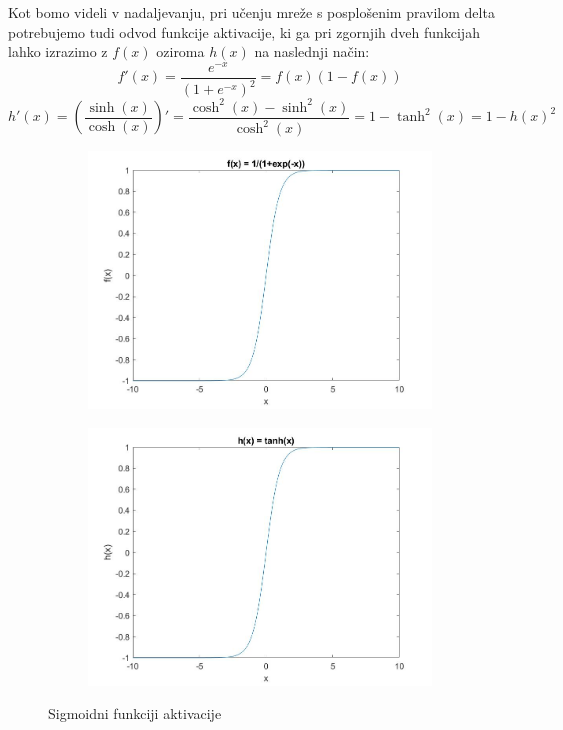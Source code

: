 \documentclass[mat1]{fmfdelo}
\begin{document}
Kot bomo videli v nadaljevanju, pri učenju mreže s posplošenim pravilom delta potrebujemo tudi odvod funkcije aktivacije, ki ga pri zgornjih dveh funkcijah lahko izrazimo z $f(x)$ oziroma $h(x)$ na naslednji način:
%
\begin{equation}
f'(x) = \frac{e^{-x}}{(1+e^{-x})^2} = f(x)(1-f(x))
\end{equation}
%
\begin{equation}
h'(x) = \left(\frac{\sinh(x)}{\cosh(x)}\right)' = \frac{\cosh^2(x)- \sinh^2(x)}{\cosh^2(x)} = 1 - \tanh^2(x) = 1 - h(x)^2 
\end{equation}
%
\begin{figure}[!th]
\centering
\begin{subfigure}{.5\textwidth}
  \centering
  \includegraphics[width=.9\linewidth]{sig_exp.jpg}
\end{subfigure}%
\begin{subfigure}{.5\textwidth}
  \centering
  \includegraphics[width=.9\linewidth]{sig_tan.jpg}
\end{subfigure}
\caption{Sigmoidni funkciji aktivacije}
\label{fig:sigmoid}
\end{figure}
%
\end{document}
